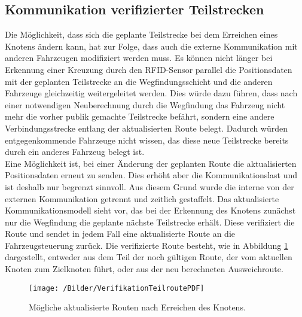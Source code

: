 	\subsection{Kommunikation verifizierter Teilstrecken}
		\label{Anpassung Kommunikation}
		Die Möglichkeit, dass sich die geplante Teilstrecke bei dem Erreichen eines Knotens ändern kann, hat zur Folge, dass auch die externe Kommunikation mit anderen Fahrzeugen modifiziert werden muss. Es können nicht länger bei Erkennung einer Kreuzung durch den \ac{RFID}-Sensor parallel die Positionsdaten mit der geplanten Teilstrecke an die Wegfindungsschicht und die anderen Fahrzeuge gleichzeitig weitergeleitet werden. Dies würde dazu führen, dass nach einer notwendigen Neuberechnung durch die Wegfindung das Fahrzeug nicht mehr die vorher publik gemachte Teilstrecke befährt, sondern eine andere Verbindungsstrecke entlang der aktualisierten Route belegt. Dadurch würden entgegenkommende Fahrzeuge nicht wissen, das diese neue Teilstrecke bereits durch ein anderes Fahrzeug belegt ist.
		\\[4pt]
		Eine Möglichkeit ist, bei einer Änderung der geplanten Route die aktualisierten Positionsdaten erneut zu senden. Dies erhöht aber die Kommunikationslast und ist deshalb nur begrenzt sinnvoll. Aus diesem Grund  wurde die interne von der externen Kommunikation getrennt und zeitlich gestaffelt. Das aktualisierte Kommunikationsmodell sieht vor, das bei der Erkennung des Knotens zunächst nur die Wegfindung die geplante nächste Teilstrecke erhält. Diese verifiziert die Route und sendet in jedem Fall eine aktualisierte Route an die Fahrzeugsteuerung zurück. Die verifizierte Route besteht, wie in Abbildung \ref{MoeglicheTeilrouten} dargestellt, entweder aus dem Teil der noch gültigen Route, der vom aktuellen Knoten zum Zielknoten führt, oder aus der neu berechneten Ausweichroute.
		
		\begin{figure}[h]
			\centering
			\texttt{[image: /Bilder/VerifikationTeilroutePDF]}
			\vspace{0.2cm}
			\caption{Mögliche aktualisierte Routen nach Erreichen des Knotens.}\label{MoeglicheTeilrouten}
		\end{figure}
		
